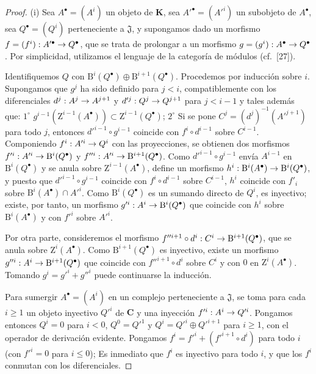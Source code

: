 \documentclass[10pt,oneside,openany]{book}
\theoremstyle{egaenv}\newtheorem*{env}{---}
\theoremstyle{egastatement}
\theoremstyle{egadescription}
\renewcommand{\leq}{\leqslant}
\renewcommand{\geq}{\geqslant}
\renewcommand{\to}{\mathchoice{\longrightarrow}{\rightarrow}{\rightarrow}{\rightarrow}}
\begin{document}
\begin{proof}
{\rm(i)}
Sea $A^\bullet=(A^i)$ un objeto de $\boldsymbol{K}$, sea $A'^\bullet=(A'^i)$ un subobjeto de $A^\bullet$, sea $Q^\bullet=(Q^i)$ perteneciente a $\mathfrak J$, y supongamos dado un morfismo
$f=(f^i):A'^\bullet\to Q^\bullet$, que se trata de prolongar a un morfismo $g=(g^i):A^\bullet\to Q^\bullet$.
Por simplicidad, utilizamos el lenguaje de la categoría de módulos (cf.~[27]).

Identifiquemos $Q$ con $\mathrm B^i(Q^\bullet)\oplus\mathrm B^{i+1}(Q^\bullet)$.
Procedemos por inducción sobre $i$.
Supongamos que $g^j$ ha sido definido para $j<i$, compatiblemente con los diferenciales $d^j:A^j\to A^{j+1}$ y $d'^j:Q^j\to Q^{j+1}$ para $j<i-1$ y tales además que: $1^\circ$ $g^{i-1}(\mathrm Z^{i-1}(A^\bullet))\subset
\mathrm Z^{i-1}(Q^\bullet)$; $2^\circ$ Si se pone $C^j=(d^j)^{-1}(A'^{j+1})$ para todo $j$, entonces $d'^{i-1}\circ g^{i-1}$ coincide con $f^i\circ d^{i-1}$ sobre $C^{i-1}$.
Componiendo $f^i:A'^i\to Q^i$ con las proyecciones, se obtienen dos morfismos $f'^i:A'^i\to\mathrm B^i(Q^\bullet)$ y $f''^i:A'^i\to\mathrm B^{i+1}(Q^\bullet)$. Como $d'^{i-1}\circ g^{i-1}$ envía $A^{i-1}$ en $\mathrm B^i(Q^\bullet)$ y se anula sobre $\mathrm Z^{i-1}(A^\bullet)$, define un morfismo
$h^i:\mathrm B^i(A^\bullet)\to\mathrm B^i(Q^\bullet)$, y puesto que $d'^{i-1}\circ g^{i-1}$ coincide con $f^i\circ d^{i-1}$ sobre $C^{i-1}$, $h^i$ coincide con $f'_i$ sobre $\mathrm B^i(A^\bullet)\cap A'^i$.
Como $\mathrm B^i(Q^\bullet)$ es un sumando directo de $Q^i$, es inyectivo; existe, por tanto, un morfismo
$g'^i:A^i\to\mathrm B^i(Q^\bullet)$
que coincide con $h^i$ sobre $\mathrm B^i(A^\bullet)$ y con $f'^i$ sobre $A'^i$.

Por otra parte, consideremos el morfismo
$f''^{i+1}\circ d^i:C^i\to\mathrm B^{i+1}(Q^\bullet)$,
que se anula sobre $\mathrm Z^i(A^\bullet)$.
Como $\mathrm B^{i+1}(Q^\bullet)$ es inyectivo, existe un morfismo
$g''^i:A^i\to\mathrm B^{i+1}(Q^\bullet)$
que coincide con $f''^{i+1}\circ d^i$ sobre $C^i$ y con $0$ en $\mathrm Z^i(A^\bullet)$.
Tomando $g^i=g'^i+g''^i$ puede continuarse la inducción.

\smallskip
{}
Para sumergir $A^\bullet=(A^i)$ en un complejo perteneciente a $\mathfrak J$, se toma para cada $i\geq1$ un objeto inyectivo $Q'^i$ de $\boldsymbol{C}$ y una inyección $f'^i:A^i\to Q'^i$. Pongamos entonces $Q^i=0$ para $i<0$, $Q^0=Q'^1$ y $Q^i=Q'^i\oplus Q'^{i+1}$ para $i\geq1$, con el operador de derivación evidente. Pongamos
$f^i=f'^i+(f'^{i+1}\circ d^i)$ para todo $i$ (con $f'^i=0$ para $i\leq0$);
Es inmediato que $f^i$ es inyectivo para todo $i$, y que los $f^i$ conmutan con los diferenciales.
\end{proof}
\end{document}
